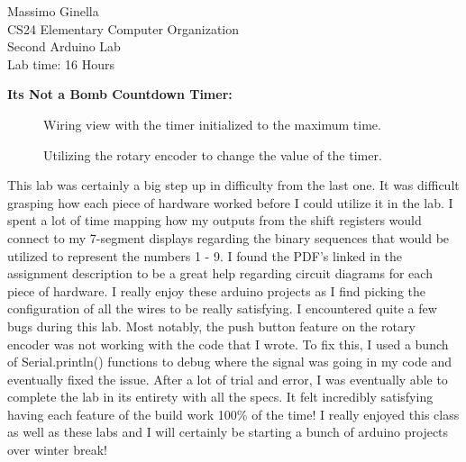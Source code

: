 \documentclass[12pt]{article}
\begin{document}
	\begin{center}
		Massimo Ginella \\
		CS24 Elementary Computer Organization \\
		Second Arduino Lab \\
		Lab time: 16 Hours \vspace{0.5cm} \\
	\end{center}
	
	\begin{center}
		
		\textbf{Its Not a Bomb Countdown Timer:} \vspace{0.1cm} \\
		\setlength{\fboxrule}{8pt}
		\begin{figure}[h]
			\centering
			\caption{Wiring view with the timer initialized to the maximum time.} %
		\end{figure}
		
		\newpage
		
		\begin{figure}[t!]
			\centering
			\caption{Utilizing the rotary encoder to change the value of the timer.} %
			\label{fig:my_label} %
		\end{figure}
		
		
	\end{center}
	
	This lab was certainly a big step up in difficulty from the last one. It was difficult grasping how each piece of hardware worked before I could utilize it in the lab. I spent a lot of time mapping how my outputs from the shift registers would connect to my 7-segment displays regarding the binary sequences that would be utilized to represent the numbers 1 - 9. I found the PDF's linked in the assignment description to be a great help regarding circuit diagrams for each piece of hardware. I really enjoy these arduino projects as I find picking the configuration of all the wires to be really satisfying. I encountered quite a few bugs during this lab. Most notably, the push button feature on the rotary encoder was not working with the code that I wrote. To fix this, I used a bunch of Serial.println() functions to debug where the signal was going in my code and eventually fixed the issue. After a lot of trial and error, I was eventually able to complete the lab in its entirety with all the specs. It felt incredibly satisfying having each feature of the build work 100\% of the time! I really enjoyed this class as well as these labs and I will certainly be starting a bunch of arduino projects over winter break!\\
	
	
	
\end{document}
